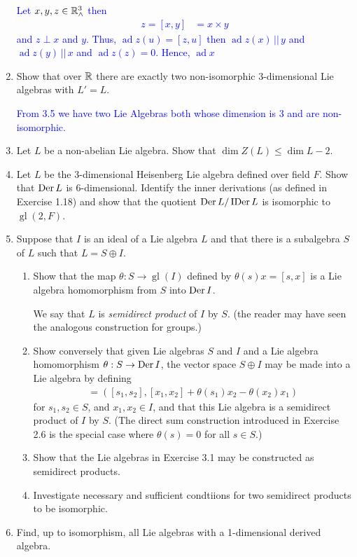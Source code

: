 \documentclass[12pt,a4paper]{report}
\newcommand{\BLUE}[1]{\textcolor{blue}{#1}}
\newcommand{\GL}{\operatorname{gl}}
\newcommand{\AD}{\operatorname{ad}}
\newcommand{\IDER}{\operatorname{IDer}}
\begin{document}
\begin{enumerate}[label=3.\arabic*.]
\BLUE{Let $x,y,z \in \mathbb{R}^3_\wedge$ then
\begin{align*}
	z=[x,y] &= x \times y
\end{align*}and $z \perp x$ and $y$.  Thus, $\AD z(u) = [z, u]$ then $\AD z(x)\, ||\, y$ and $\AD z(y) \,||\, x$ and $\AD z(z) = 0$.  Hence, $\AD x$
}

\item Show that over $\mathbb{R}$ there are exactly two non-isomorphic 3-dimensional Lie algebras with $L'=L$.

\BLUE{From 3.5 we have two Lie Algebras both whose dimension is 3 and are non-isomorphic.}

\item Let $L$ be a non-abelian Lie algebra.  Show that $\dim Z(L) \le \dim L -2$.

\item Let $L$ be the 3-dimensional Heisenberg Lie algebra defined over field $F$.  Show that $\operatorname{Der} L$ is 6-dimensional.  Identify the inner derivations (as defined in Exercise 1.18) and show that the quotient $\DER L/\IDER L$ is isomorphic to $\GL(2,F)$.

\item Suppose that $I$ is an ideal of a Lie algebra $L$ and that there is a subalgebra $S$ of $L$ such that $L=S\oplus I$.

\begin{enumerate}[label=(\roman*)]

	\item Show that the map $\theta : S \to \GL(I)$ defined by $\theta(s)x=[s,x]$ is a Lie algebra homomorphism from $S$ into $\operatorname{Der} I$.
	
	We say that $L$ is \textit{semidirect product} of $I$ by $S$.  (the reader may have seen the analogous construction for groups.)
	
	\item Show conversely that given Lie algebras $S$ and $I$ and a Lie algebra homomorphism $\theta : S \to \operatorname{Der} I$, the vector space $S \oplus I$ may be made into a Lie algebra by defining
	\begin{align*}
		[(s_1,x_1),(s_2,x_2)] = ([s_1,s_2],[x_1,x_2]+\theta(s_1)x_2-\theta(x_2)x_1)
	\end{align*}for $s_1,s_2 \in S$, and $x_1,x_2 \in I$, and that this Lie algebra is a semidirect product of $I$ by $S$.  (The direct sum construction introduced in Exercise 2.6 is the special case where $\theta(s)=0$ for all $s \in S$.)
	
	\item Show that the Lie algebras in Exercise 3.1 may be constructed as semidirect products.
	
	\item Investigate necessary and sufficient condtiions for two semidirect products to be isomorphic.

\end{enumerate}

\item Find, up to isomorphism, all Lie algebras with a 1-dimensional derived algebra.

\end{enumerate}
\end{document}
